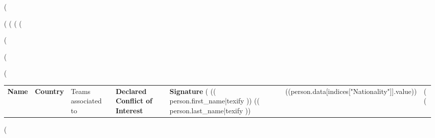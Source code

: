 (%

(%
(%
(%
(%


(%
\usepackage{longtable}
(%

(%
\begin{longtable}{lllll}

\textbf{Name}&\textbf{Country} & \textsf{Teams associated to}&\textbf{Declared Conflict of Interest}&\textbf{Signature}\endhead
\hline
(%
(( person.first_name|texify )) (( person.last_name|texify ))& ((person.data[indices["Nationality"]].value)) & (%
\hline
(%
\end{longtable}

(%